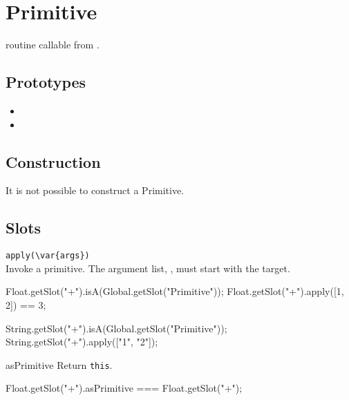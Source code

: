 \section{Primitive}
\Cxx routine callable from \us.

\subsection{Prototypes}
\begin{itemize}
\item {}
\item {}
\end{itemize}

\subsection{Construction}

It is not possible to construct a Primitive.

\subsection{Slots}

\begin{urbiscriptapi}
\item \lstinline|apply(\var{args})|\\
  Invoke a primitive.  The argument list, , must start with
  the target.
\begin{urbiassert}
Float.getSlot("+").isA(Global.getSlot("Primitive"));
Float.getSlot("+").apply([1, 2]) == 3;

String.getSlot("+").isA(Global.getSlot("Primitive"));
String.getSlot("+").apply(["1", "2"]);
\end{urbiassert}

\item[asPrimitive] Return \lstinline|this|.
\begin{urbiassert}
Float.getSlot("+").asPrimitive === Float.getSlot("+");
\end{urbiassert}
\end{urbiscriptapi}


